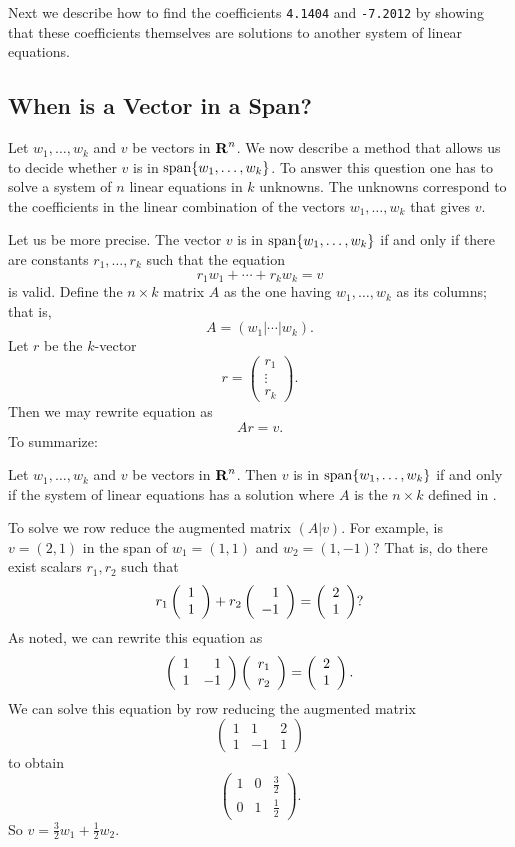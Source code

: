 Next we describe how to find the coefficients {\tt 4.1404} and
{\tt -7.2012} by showing that these coefficients themselves are
solutions to another system of linear equations.

\subsection*{When is a Vector in a Span?} 

Let $w_1,\ldots,w_k$ and $v$ be vectors in $\mbox{$\bf{R}$}^n$.  We now
describe a method that allows us to decide whether $v$ is in
${\rm span}\{w_1,\ldots,w_k\}$.  To answer this question one has
to solve a system of $n$ linear equations in $k$ unknowns.
The unknowns correspond to the coefficients in the linear
combination of the vectors $w_1,\ldots,w_k$ that gives $v$.

Let us be more precise.  The vector $v$ is in
${\rm span}\{w_1,\ldots,w_k\}$ if and only if there are constants
$r_1,\ldots,r_k$ such that the equation
\begin{equation}  \label{e:lindepeqn}
     r_1 w_1 + \cdots + r_k w_k = v
\end{equation}
is valid.  Define the $n\times k$ matrix $A$ as the one having
$w_1,\ldots,w_k$ as its columns; that is,
\begin{equation}  \label{E:Abycol}
A = (w_1| \cdots |w_k).
\end{equation}
Let  $r$ be the $k$-vector
\[
r= \left(\begin{array}{c} r_1 \\ \vdots \\ r_k\end{array}\right).
\]
Then we may rewrite equation  as
\begin{equation}  \label{E:Ar=v}
   Ar=v.
\end{equation}
To summarize:
\begin{lemma}
Let $w_1,\ldots,w_k$ and $v$ be vectors in $\mbox{$\bf{R}$}^n$.  Then $v$
is in ${\rm span}\{w_1,\ldots,w_k\}$ if and only if the system of linear
equations  has a solution where $A$ is the $n\times k$
defined in .
\end{lemma}

To solve  we row reduce the
augmented matrix $(A|v)$.
For example, is $v=(2,1)$ in the span of $w_1=(1,1)$ and $w_2=(1,-1)$?
That is, do there exist scalars $r_1,r_2$ such that
\[
r_1\left(\begin{array}{r} 1 \\ 1\end{array}\right) + r_2\left(\begin{array}{r} 1 \\ -1\end{array}\right) = \left(\begin{array}{r} 2 \\ 1\end{array}\right)?
\]
As noted, we can rewrite this equation as
\[
\left(\begin{array}{rr} 1 & 1\\ 1 &-1\end{array}\right)\left(\begin{array}{r} r_1 \\ r_2\end{array}\right) = \left(\begin{array}{r} 2 \\ 1\end{array}\right).
\]
We can solve this equation by row reducing the augmented
matrix
\[
\left(\begin{array}{rr|r}
1 & 1 & 2 \\ 1 & -1 & 1 \end{array}\right)
\]
to obtain
\[
\left(\begin{array}{rr|r}
1 & 0 & \frac{3}{2} \\ 0 & 1 & \frac{1}{2}
\end{array}\right).
\]
So $v = \frac{3}{2}w_1 + \frac{1}{2}w_2$.

